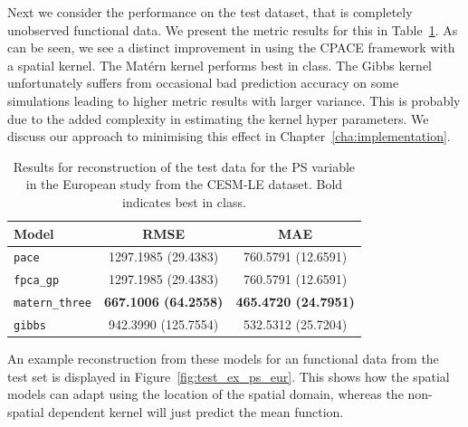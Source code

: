Next we consider the performance on the test dataset, that is completely unobserved functional data.
We present the metric results for this in Table~\ref{tab:test_cesm_ps_eur}.
As can be seen, we see a distinct improvement in using the CPACE framework with a spatial kernel.
The Mat\'ern kernel performs best in class.
The Gibbs kernel unfortunately suffers from occasional bad prediction accuracy on some simulations leading to higher metric results with larger variance.
This is probably due to the added complexity in estimating the kernel hyper parameters.
We discuss our approach to minimising this effect in Chapter~\ref{cha:implementation}.

\begin{table}
	\caption[Results for PS variable on test data in the European study]{Results for reconstruction of the test data for the PS variable in the European study from the CESM-LE dataset. Bold indicates best in class.}
	\centering
	\label{tab:test_cesm_ps_eur}
	\begin{tabular}{lcc}
		\toprule
		\textbf{Model} & \textbf{RMSE} & \textbf{MAE} \\
		\midrule
		\verb*|pace| & 1297.1985 (29.4383) & 760.5791 (12.6591) \\
		\verb*|fpca_gp| & 1297.1985 (29.4383) & 760.5791 (12.6591) \\
		\verb*|matern_three| & \textbf{667.1006 (64.2558)}& \textbf{465.4720 (24.7951)}\\
		\verb*|gibbs| & 942.3990 (125.7554) & 532.5312 (25.7204)\\
		\bottomrule
	\end{tabular}
\end{table}

An example reconstruction from these models for an functional data from the test set is displayed in Figure~\ref{fig:test_ex_ps_eur}. 
This shows how the spatial models can adapt using the location of the spatial domain, whereas the non-spatial dependent kernel will just predict the mean function.

